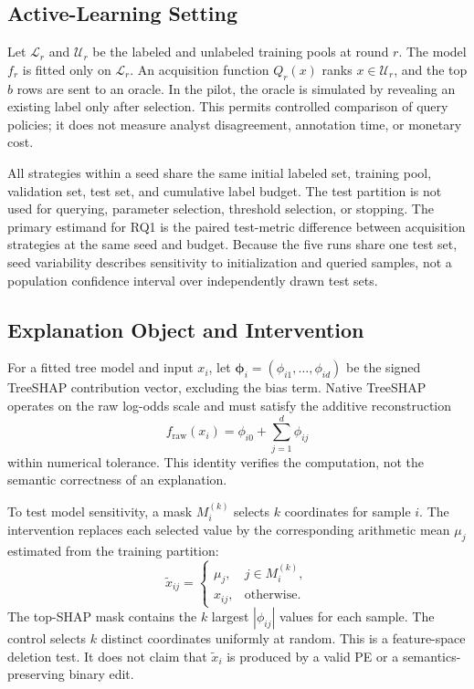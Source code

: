 \subsection{Active-Learning Setting}

Let $\mathcal{L}_r$ and $\mathcal{U}_r$ be the labeled and unlabeled training
pools at round $r$. The model $f_r$ is fitted only on $\mathcal{L}_r$. An
acquisition function $Q_r(x)$ ranks $x\in\mathcal{U}_r$, and the top $b$ rows are
sent to an oracle. In the pilot, the oracle is simulated by revealing an existing
label only after selection. This permits controlled comparison of query policies;
it does not measure analyst disagreement, annotation time, or monetary cost.

All strategies within a seed share the same initial labeled set, training pool,
validation set, test set, and cumulative label budget. The test partition is not
used for querying, parameter selection, threshold selection, or stopping. The
primary estimand for RQ1 is the paired test-metric difference between acquisition
strategies at the same seed and budget. Because the five runs share one test set,
seed variability describes sensitivity to initialization and queried samples, not
a population confidence interval over independently drawn test sets.

\subsection{Explanation Object and Intervention}

For a fitted tree model and input $x_i$, let
$\boldsymbol{\phi}_i=(\phi_{i1},\ldots,\phi_{id})$ be the signed TreeSHAP
contribution vector, excluding the bias term. Native TreeSHAP operates on the raw
log-odds scale and must satisfy the additive reconstruction
\begin{equation}
f_{\mathrm{raw}}(x_i)=\phi_{i0}+\sum_{j=1}^{d}\phi_{ij}
\label{eq:additivity}
\end{equation}
within numerical tolerance. This identity verifies the computation, not the
semantic correctness of an explanation.

To test model sensitivity, a mask $M_i^{(k)}$ selects $k$ coordinates for sample
$i$. The intervention replaces each selected value by the corresponding
arithmetic mean $\mu_j$ estimated from the training partition:
\begin{equation}
\widetilde{x}_{ij}=\begin{cases}
\mu_j, & j\in M_i^{(k)},\\
x_{ij}, & \text{otherwise}.
\end{cases}
\label{eq:mask}
\end{equation}
The top-SHAP mask contains the $k$ largest $|\phi_{ij}|$ values for each sample.
The control selects $k$ distinct coordinates uniformly at random. This is a
feature-space deletion test. It does not claim that $\widetilde{x}_i$ is produced
by a valid PE or a semantics-preserving binary edit.

